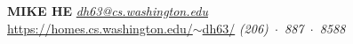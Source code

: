 \documentclass{resume}
\begin{document}
\vspace{-0.5in}

	\MakeUppercase{\Large{\textbf{Mike He}}} \hfill {\em{\href{mailto:dh63@cs.washington.edu}{dh63@cs.washington.edu}}}\\
	\vspace{-5pt}\href{https://homes.cs.washington.edu/~dh63/}{https://homes.cs.washington.edu/$\sim$dh63/} \hfill{\em (206)~$\cdot$~887~$\cdot$~8588}



\end{document}

